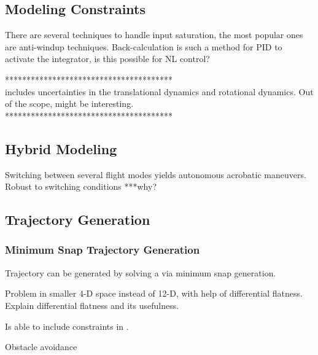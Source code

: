 \subsection{Modeling Constraints}
There are several techniques to handle input saturation, the most popular ones are anti-windup techniques. Back-calculation is such a method for PID to activate the integrator, is this possible for NL control?

***************************************\\
\cite{Goodarzi2013a} includes uncertainties in the translational dynamics and rotational dynamics. Out of the scope, might be interesting.\\
***************************************\\

\subsection{Hybrid Modeling}
Switching between several flight modes yields autonomous acrobatic maneuvers. Robust to switching conditions ***why?\\
\cite{Tang2014}

\subsection{Trajectory Generation}
\subsubsection{Minimum Snap Trajectory Generation}

Trajectory can be generated by solving a  via minimum snap generation.

Problem in smaller 4-D space instead of 12-D, with help of differential flatness. Explain differential flatness and its usefulness.

Is able to include constraints in .

\cite{Mellinger2011}

Obstacle avoidance

